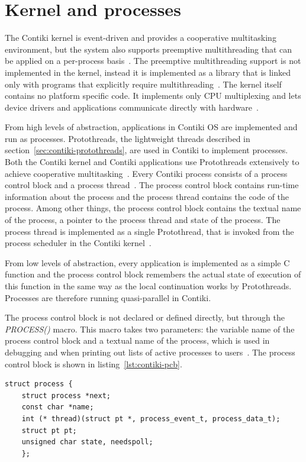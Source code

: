 
\section{Kernel and processes}\label{sec:contiki-kernel}
The Contiki kernel is event-driven and provides a cooperative multitasking
environment, but the system also supports preemptive
multithreading that can be applied on a per-process basis~\cite{paper-contiki}.
The preemptive multithreading support is not implemented in the kernel, instead
it is implemented as a library that is linked only with programs that
explicitly require multithreading~\cite{paper-contiki}.
The kernel itself contains no platform specific code.
It implements only CPU multiplexing and
lets device drivers and applications communicate directly with hardware~\cite{paper-contiki}.

From high levels of abstraction,
applications in Contiki OS are implemented and run as processes.
Protothreads, the lightweight threads described in section~\ref{sec:contiki-protothreads},
are used in Contiki to implement processes.
Both the Contiki kernel and Contiki applications use
Protothreads extensively to achieve cooperative multitasking~\cite{contiki-wiki-faq}.
Every Contiki process consists of a process control block and a process thread~\cite{contiki-wiki-processes}.
The process control block contains run-time information about the process and
the process thread contains the code of the process.
Among other things, the process control block contains
the textual name of the process, a pointer to the process thread and state of the process.
The process thread is implemented as a single Protothread,
that is invoked from the process scheduler in the Contiki kernel~\cite{contiki-wiki-processes}.

From low levels of abstraction,
every application is implemented as a simple C function
and the process control block remembers the actual state of execution of this function
in the same way as the local continuation works by Protothreads.
Processes are therefore running quasi-parallel in Contiki.

The process control block is not declared or defined directly,
but through the {\it{PROCESS()}} macro.
This macro takes two parameters: the variable name of the process control block
and a textual name of the process,
which is used in debugging and when printing out lists of active processes to users~\cite{contiki-wiki-processes}.
The process control block is shown in listing~\ref{lst:contiki-pcb}.
\bigskip
\begin{lstlisting}[caption={Process control block in Contiki OS (source~\cite{contiki-wiki-processes})},label={lst:contiki-pcb}]
struct process {
	struct process *next;
	const char *name;
	int (* thread)(struct pt *, process_event_t, process_data_t);
	struct pt pt;
	unsigned char state, needspoll;
	};
\end{lstlisting}

